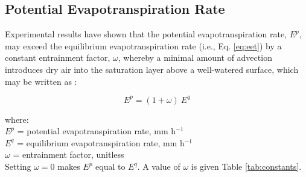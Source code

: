 \subsection{Potential Evapotranspiration Rate}
\label{sec:pet}
Experimental results have shown that the potential evapotranspiration rate, $E^p$, may exceed the equilibrium evapotranspiration rate (i.e., Eq. \ref{eq:eet}) by a constant entrainment factor, $\omega$, whereby a minimal amount of advection introduces dry air into the saturation layer above a well-watered surface, which may be written as \parencite{lhomme97, priestley72}:

\begin{equation}
\label{eq:pet}
	E^p = \left(1 + \omega \right)\: E^q
\end{equation}

\noindent where:\\
\indent $E^p$ = potential evapotranspiration rate, mm h$^{-1}$\\
\indent $E^q$ = equilibrium evapotranspiration rate, mm h$^{-1}$\\
\indent $\omega$ = entrainment factor, unitless \\

\noindent Setting $\omega = 0$ makes $E^p$ equal to $E^q$. 
A value of $\omega$ is given Table \ref{tab:constants}.

